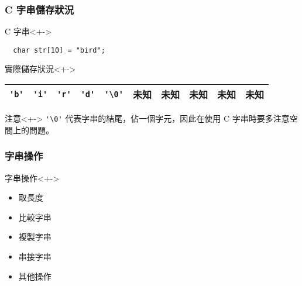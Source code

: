 \documentclass[utf8]{beamer}
\begin{document}
\begin{CJK}{UTF8}{bkai}
\begin{frame}[fragile]
  \frametitle{C 字串儲存狀況}
  \begin{block}{C 字串}<+->
    \begin{lstlisting}
  char str[10] = "bird";
    \end{lstlisting}
  \end{block}
  \begin{exampleblock}{實際儲存狀況}<+->
  \begin{table}[h]
    \begin{tabular}{|c|c|c|c|c|c|c|c|c|c|}
    \hline
    \lstinline{'b'}{} & \lstinline{'i'}{} & \lstinline{'r'}{} & \lstinline{'d'}{} &
    \lstinline{'\0'}{} & 未知 & 未知 & 未知 & 未知 & 未知\\
    \hline
    \end{tabular}
  \end{table}
  \end{exampleblock}
  \begin{alertblock}{注意}<+->
  \lstinline{'\0'}{} 代表\alert{字串的結尾}，佔一個字元，因此在使用 C 字串時要多注意空間上的問題。
  \end{alertblock}
\end{frame}

\begin{frame}[fragile]
  \frametitle{字串操作}
  \begin{block}{字串操作}<+->
    \begin{itemize}[<+->]
    \item 取長度
    \item 比較字串
    \item 複製字串
    \item 串接字串
    \item 其他操作
    \end{itemize}
  \end{block}
\end{frame}


\end{CJK}
\end{document}
